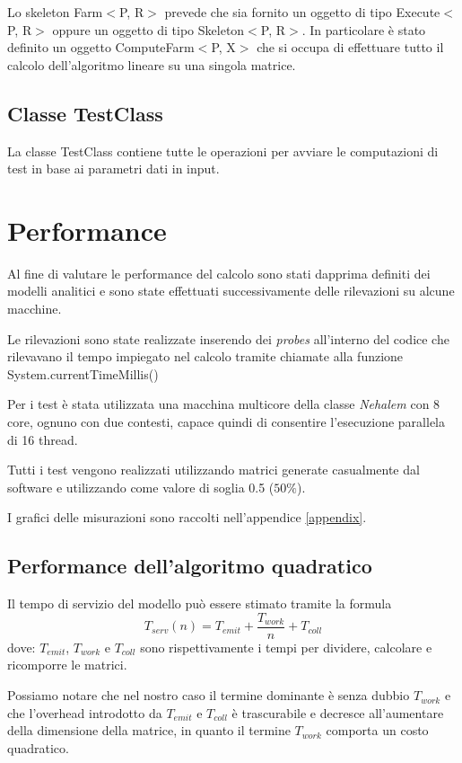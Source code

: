 \documentclass[a4paper,10pt]{article}
\begin{document}
Lo skeleton \textsf{Farm$<$P, R$>$} prevede che sia fornito un oggetto di tipo \textsf{Execute$<$P, R$>$} oppure un oggetto di tipo \textsf{Skeleton$<$P, R$>$}. In particolare \`e stato definito un oggetto \textsf{ComputeFarm$<$P, X$>$} che si occupa di effettuare tutto il calcolo dell'algoritmo lineare su una singola matrice.

\subsection{Classe \textsf{TestClass}}

La classe \textsf{TestClass} contiene tutte le operazioni per avviare le computazioni di test in base ai parametri dati in input.

\section{Performance}
\label{sec:performance}

Al fine di valutare le performance del calcolo sono stati dapprima definiti dei modelli analitici e sono state effettuati successivamente delle rilevazioni su alcune macchine.

Le rilevazioni sono state realizzate inserendo dei \emph{probes} all'interno del codice che rilevavano il tempo impiegato nel calcolo tramite chiamate alla funzione \textsf{System.currentTimeMillis()}

Per i test \`e stata utilizzata una macchina multicore della classe \emph{Nehalem} con 8 core, ognuno con due contesti, capace quindi di consentire l'esecuzione parallela di 16 thread.

Tutti i test vengono realizzati utilizzando matrici generate casualmente dal software e utilizzando come valore di soglia 0.5 ($50\%$).

I grafici delle misurazioni sono raccolti nell'appendice \ref{appendix}.

\subsection{Performance dell'algoritmo quadratico}
\label{mod:quad}

Il tempo di servizio del modello pu\`o essere stimato tramite la formula $$T_{serv}(n) = T_{emit} + \frac{T_{work}}{n} + T_{coll}$$ dove:
$T_{emit}$, $T_{work}$ e $T_{coll}$ sono rispettivamente i tempi per dividere, calcolare e ricomporre le matrici.

Possiamo notare che nel nostro caso il termine dominante \`e senza dubbio $T_{work}$ e che l'overhead introdotto da $T_{emit}$ e $T_{coll}$ \`e trascurabile e decresce all'aumentare della dimensione della matrice, in quanto il termine $T_{work}$ comporta un costo quadratico.
\end{document}
